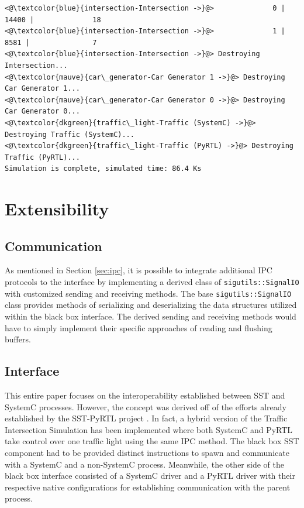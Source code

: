 \documentclass{article}
\begin{document}
\begin{lstlisting}[caption={Sample Simulation Output}, captionpos=b]
<@\textcolor{blue}{intersection-Intersection ->}@>              0 |       14400 |              18
<@\textcolor{blue}{intersection-Intersection ->}@>              1 |        8581 |               7
<@\textcolor{blue}{intersection-Intersection ->}@> Destroying Intersection...
<@\textcolor{mauve}{car\_generator-Car Generator 1 ->}@> Destroying Car Generator 1...
<@\textcolor{mauve}{car\_generator-Car Generator 0 ->}@> Destroying Car Generator 0...
<@\textcolor{dkgreen}{traffic\_light-Traffic (SystemC) ->}@> Destroying Traffic (SystemC)...
<@\textcolor{dkgreen}{traffic\_light-Traffic (PyRTL) ->}@> Destroying Traffic (PyRTL)...
Simulation is complete, simulated time: 86.4 Ks
\end{lstlisting}

  \section{Extensibility}

    \subsection{Communication}
    As mentioned in Section \ref{sec:ipc}, it is possible to integrate additional IPC protocols to
    the interface by implementing a derived class of \lstinline{sigutils::SignalIO} with customized
    sending and receiving methods. The base \lstinline{sigutils::SignalIO} class provides methods of
    serializing and deserializing the data structures utilized within the black box interface. The
    derived sending and receiving methods would have to simply implement their specific approaches
    of reading and flushing buffers.

    \subsection{Interface}

    This entire paper focuses on the interoperability established between SST and SystemC processes.
    However, the concept was derived off of the efforts already established by the SST-PyRTL project
    \cite{pyrtl-sst}. In fact, a hybrid version of the Traffic Intersection Simulation has been
    implemented where both SystemC and PyRTL take control over one traffic light using the same IPC
    method. The black box SST component had to be provided distinct instructions to spawn and
    communicate with a SystemC and a non-SystemC process. Meanwhile, the other side of the black box
    interface consisted of a SystemC driver and a PyRTL driver with their respective native
    configurations for establishing communication with the parent process.
\end{document}
